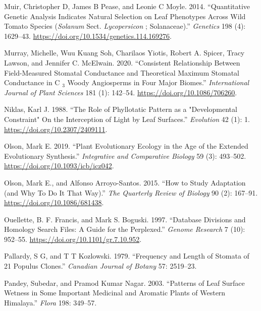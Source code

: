 \documentclass[
  12pt,
]{article}
\newlength{\cslhangindent}
\newlength{\cslentryspacingunit} %
\newenvironment{CSLReferences}[2] %
 {%
  \setlength{\parindent}{0pt}
  \ifodd #1
  \let\oldpar\par
  \def\par{\hangindent=\cslhangindent\oldpar}
  \fi
  \setlength{\parskip}{#2\cslentryspacingunit}
 }%
 {}
\begin{document}
\begin{CSLReferences}{1}{0}
\leavevmode{}%
Muir, Christopher D, James B Pease, and Leonie C Moyle. 2014. {``Quantitative {Genetic} {Analysis} {Indicates} {Natural} {Selection} on {Leaf} {Phenotypes} {Across} {Wild} {Tomato} {Species} (\emph{Solanum} Sect. \emph{Lycopersicon} ; {Solanaceae}).''} \emph{Genetics} 198 (4): 1629--43. \url{https://doi.org/10.1534/genetics.114.169276}.

\leavevmode{}%
Murray, Michelle, Wuu Kuang Soh, Charilaos Yiotis, Robert A. Spicer, Tracy Lawson, and Jennifer C. McElwain. 2020. {``Consistent {Relationship} Between {Field}-{Measured} {Stomatal} {Conductance} and {Theoretical} {Maximum} {Stomatal} {Conductance} in {C} \(_{\textrm{3}}\) {Woody} {Angiosperms} in {Four} {Major} {Biomes}.''} \emph{International Journal of Plant Sciences} 181 (1): 142--54. \url{https://doi.org/10.1086/706260}.

\leavevmode{}%
Niklas, Karl J. 1988. {``The {Role} of {Phyllotatic} {Pattern} as a "{Developmental} {Constraint}" {On} the {Interception} of {Light} by {Leaf} {Surfaces}.''} \emph{Evolution} 42 (1): 1. \url{https://doi.org/10.2307/2409111}.

\leavevmode{}%
Olson, Mark E. 2019. {``Plant {Evolutionary} {Ecology} in the {Age} of the {Extended} {Evolutionary} {Synthesis}.''} \emph{Integrative and Comparative Biology} 59 (3): 493--502. \url{https://doi.org/10.1093/icb/icz042}.

\leavevmode{}%
Olson, Mark E., and Alfonso Arroyo-Santos. 2015. {``How to {Study} {Adaptation} (and {Why} {To} {Do} {It} {That} {Way}).''} \emph{The Quarterly Review of Biology} 90 (2): 167--91. \url{https://doi.org/10.1086/681438}.

\leavevmode{}%
Ouellette, B. F. Francis, and Mark S. Boguski. 1997. {``Database {Divisions} and {Homology} {Search} {Files}: {A} {Guide} for the {Perplexed}.''} \emph{Genome Research} 7 (10): 952--55. \url{https://doi.org/10.1101/gr.7.10.952}.

\leavevmode{}%
Pallardy, S G, and T T Kozlowski. 1979. {``Frequency and Length of Stomata of 21 {Populus} Clones.''} \emph{Canadian Journal of Botany} 57: 2519--23.

\leavevmode{}%
Pandey, Subedar, and Pramod Kumar Nagar. 2003. {``Patterns of Leaf Surface Wetness in Some Important Medicinal and Aromatic Plants of {Western} {Himalaya}.''} \emph{Flora} 198: 349--57.


\end{CSLReferences}
\end{document}
